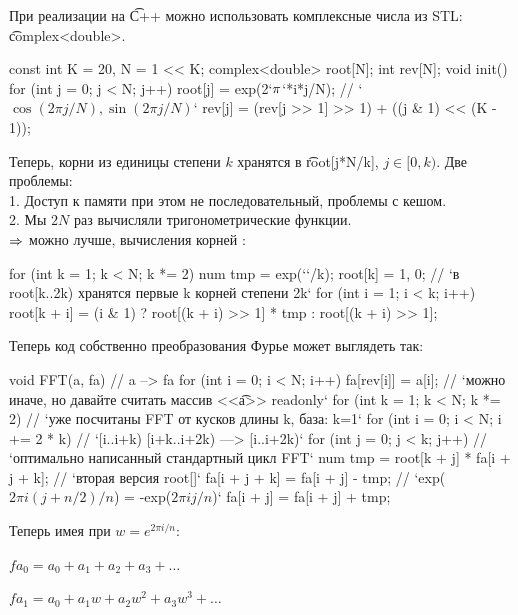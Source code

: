 При реализации на \t{C++} можно использовать комплексные числа из STL: \t{complex<double>}.

\begin{code}
const int K = 20, N = 1 << K;
complex<double> root[N];
int rev[N];
void init() {
	for (int j = 0; j < N; j++) {
		root[j] = exp(2`$\color{black}{\pi}$`*i*j/N); // `$\cos(2\pi j/N), \sin(2\pi j/N)$`
		rev[j] = (rev[j >> 1] >> 1) + ((j & 1) << (K - 1));
	}
}
\end{code}

Теперь, корни из единицы степени $k$ хранятся в \t{root[j*N/k]}, $j \in [0,k)$. Две проблемы: \\
1. Доступ к памяти при этом не последовательный, проблемы с кешом.\\
2. Мы $2N$ раз вычисляли тригонометрические функции.\\
$\Rightarrow$ можно лучше, вычисления корней :

\begin{code}
for (int k = 1; k < N; k *= 2) {
	num tmp = exp(`\color{black}{$\pi$}`/k);
	root[k] = {1, 0}; // `в root[k..2k) хранятся первые k корней степени 2k`
	for (int i = 1; i < k; i++)
		root[k + i] = (i & 1) ? root[(k + i) >> 1] * tmp : root[(k + i) >> 1];
}
\end{code}

Теперь код собственно преобразования Фурье может выглядеть так:

\begin{code}
void FFT(a, fa) { // a --> fa
  for (int i = 0; i < N; i++)
    fa[rev[i]] = a[i]; // `можно иначе, но давайте считать массив <<\t{a}>> readonly`
  for (int k = 1; k < N; k *= 2) // `уже посчитаны FFT от кусков длины k, база: k=1`
    for (int i = 0; i < N; i += 2 * k) // `[i..i+k) [i+k..i+2k) ---> [i..i+2k)`
      for (int j = 0; j < k; j++) { // `оптимально написанный стандартный цикл FFT`
        num tmp = root[k + j] * fa[i + j + k]; // `вторая версия root[]`
        fa[i + j + k] = fa[i + j] - tmp; // `exp(${2\pi i(j{+}n/2)/n}$) = {-}exp(${2\pi i j / n}$)`
        fa[i + j] = fa[i + j] + tmp;
      }
}
\end{code}

\pagebreak
\vspace*{-1.5em}

Теперь имея при $w = e^{2 \pi i / n}$:

$fa_0 = a_0 + a_1 + a_2 + a_3 + \dots$

$fa_1 = a_0 + a_1w + a_2w^2 + a_3w^3 + \dots$

